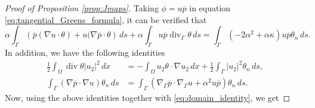 \documentclass[a4paper,11pt]{article}
\newcommand{\vect}[1]{\boldsymbol{\mathbf{#1}}}
\newcommand{\dive}{\operatorname{div}}
\newcommand{\tannabla}{\nabla_{\varGamma}}
\newcommand{\tandive}{\operatorname{div}_{\varGamma}}
\newcommand{\ui}{u_{2}}
\newcommand{\VV}{\theta}
\newcommand{\Vn}{\theta_{n}}
\newcommand{\nn}{\vect{n}}
\newcommand{\dn}[1]{\partial_{\nn}{#1}}
\newcommand{\intO}[1]{\int_{\varOmega}{#1}{\, {d}{x}}}
\newcommand{\intG}[1]{\int_{\varGamma}{#1}{\, {d}{s}}}
\begin{document}
\begin{proof}[Proof of Proposition \ref{prop:Jmaps}]
Taking $\phi = u \overline{p}$ in equation \eqref{eq:tangential_Greens_formula}, %
it can be verified that
\[
		\alpha\intG{\left(  \overline{p} (\nabla u \cdot \VV) + u ( \nabla \overline{p} \cdot \VV \right)} + \alpha\intG{u \overline{p} \tandive \VV } 
		=\intG{ \left( -2\alpha^2 + \alpha\kappa \right) u \overline{p} {\Vn}}.
\]
%
In addition, we have the following identities
\begin{align*}
\frac12 \intO{  \dive \VV |\ui|^{2} }
	&= - \intO{ \ui \VV \cdot \nabla \ui } + \frac12 \intG{ |\ui|^{2} \Vn },\\
%
%
%
\intG{(\nabla \overline{{p}} \cdot \nabla {u})\Vn}
	&= \intG{(\tannabla \overline{{p}} \cdot \tannabla {u} + \alpha^2 u \overline{p} )\Vn}.
\end{align*}
%
Now, using the above identities together with \eqref{eq:domain_identity}, we get
%

\end{proof}
\end{document}
